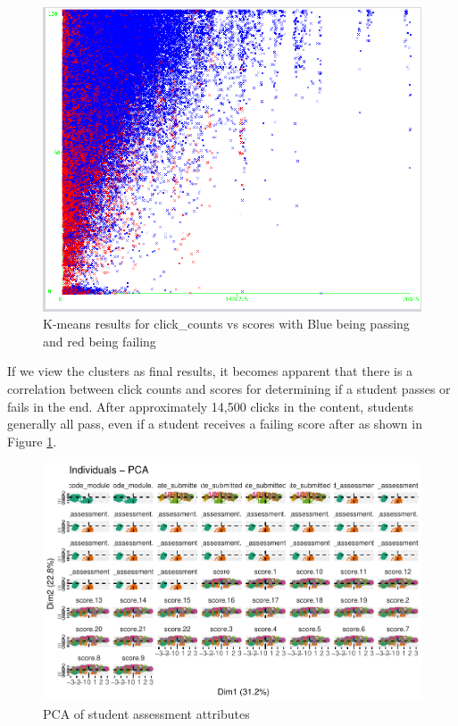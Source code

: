 \documentclass[12pt]{article}
\begin{document}
 \begin{figure}[h]
 \centering
 \includegraphics[scale=0.35]{click_count_vs_score_finalresults.png}
 \caption{K-means results for click\_counts vs scores with Blue being passing and red being failing}
 \label{fig:click_vs_score_f}
 \end{figure}

 
 If we view the clusters as final results, it becomes apparent that there is a correlation between click counts and scores for determining if a student passes or fails in the end. After approximately 14,500 clicks in the content, students generally all pass, even if a student receives a failing score after as shown in Figure \ref{fig:click_vs_score_f}.


\begin{figure}[h]
 \centering
 \includegraphics[scale=0.8]{PCA_Assessments_first50.pdf}
 \caption{PCA of student assessment attributes}
 \label{fig:pca}
 \end{figure}
\end{document}
